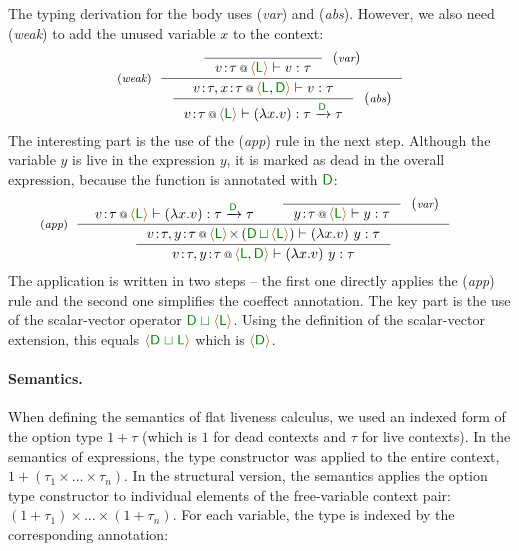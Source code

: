 The typing derivation for the body uses (\emph{var}) and (\emph{abs}). However, we also need (\emph{weak})
to add the unused variable $x$ to the context:
%
\begin{equation*}
\tyrule{weak}
{ \tyruler{var}
    {}
    { \coctx{v\!:\!\tau}{\alift{ \cclrd{\cclrd{\ident{L}}} }} \vdash v : \tau } }
{ \tyruler{abs}
    { \coctx{v\!:\!\tau, x\!:\!\tau}{\alift{ \cclrd{\cclrd{\ident{L}}},\cclrd{\cclrd{\ident{D}}} }} \vdash v : \tau }
    { \coctx{v\!:\!\tau}{\alift{ \cclrd{\cclrd{\ident{L}}} }} \vdash (\lambda x . v) : \tau \xrightarrow{\cclrd{\cclrd{\ident{D}}}} \tau }}
\end{equation*}
%
The interesting part is the use of the (\emph{app}) rule in the next step. Although the variable $y$ is live in the expression $y$,
it is marked as dead in the overall expression, because the function is annotated with $\ident{\cclrd{D}}$:
%
\begin{equation*}
\hspace{-2em}
\tyrule{app}
  {
    \begin{array}{l}
    \vspace{-1.2em}
    \coctx{v\!:\!\tau}{\alift{ \cclrd{\cclrd{\ident{L}}} }} \vdash (\lambda x . v) : \tau \xrightarrow{\cclrd{\cclrd{\ident{D}}}} \tau
    \end{array} &
    \tyruler{var}{}{\coctx{y\!:\!\tau}{\alift{ \cclrd{\cclrd{\ident{L}}} }} \vdash y : \tau}
  }
  {
  \inference
  	{ \coctx{v\!:\!\tau, y\!:\!\tau}{\alift{ \cclrd{\cclrd{\ident{L}}} } \cons\, ({ \cclrd{\cclrd{\ident{D}}} \,\cclrd{\sqcup}\, \alift{\cclrd{\cclrd{\ident{L}}}} })}
  	     \vdash (\lambda x . v)~y : \tau }
  	{ \coctx{v\!:\!\tau, y\!:\!\tau}{\alift{ \cclrd{\cclrd{\ident{L}}}, \cclrd{\cclrd{\ident{D}}} }} \vdash (\lambda x . v)~y : \tau }
  }
\end{equation*}
%
The application is written in two steps -- the first one directly applies the (\emph{app}) rule
and the second one simplifies the coeffect annotation. The key part is the use of the scalar-vector
operator $\cclrd{\cclrd{\ident{D}}} \;\cclrd{\sqcup}\; \alift{\cclrd{\cclrd{\ident{L}}}}$. Using the definition of the scalar-vector
extension, this equals $\alift{\cclrd{\cclrd{\ident{D}}} \;\cclrd{\sqcup}\; \cclrd{\cclrd{\ident{L}}}}$ which is
$\alift{\cclrd{\cclrd{\ident{D}}}}$.


\paragraph{Semantics.}
When defining the semantics of flat liveness calculus, we used an indexed form of the option type
$1 + \tau$ (which is $1$ for dead contexts and $\tau$ for live contexts). In the semantics of
expressions, the type constructor was applied to the entire context, \ie~$1+(\tau_1 \times \ldots \times \tau_n)$.
In the structural version, the semantics applies the option type constructor to individual elements
of the free-variable context pair: $(1+\tau_1) \times \ldots \times (1+ \tau_n)$. For each variable,
the type is indexed by the corresponding annotation:

